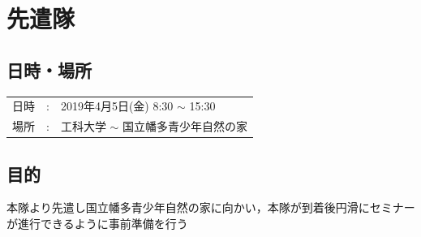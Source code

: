 %
\section{先遣隊}

\subsection{日時・場所}

\begin{tabular}{p{}rp{}}
  日時 & : & 2019年4月5日(金) 8:30 $\sim$ 15:30\\
  場所 & : & 工科大学 $\sim$ 国立幡多青少年自然の家
\end{tabular}

\subsection{目的}
本隊より先遣し国立幡多青少年自然の家に向かい，本隊が到着後円滑にセミナーが進行できるように事前準備を行う


